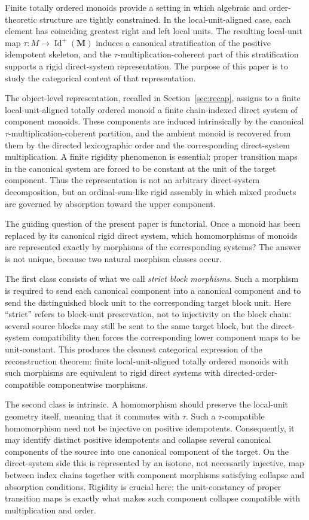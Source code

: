 \documentclass[pdflatex,sn-mathphys-num]{sn-jnl}
\theoremstyle{thmstyleone}%
\theoremstyle{thmstyletwo}%
\theoremstyle{thmstylethree}%
\newcommand{\PosId}{\operatorname{Id}^{+}}
\begin{document}
Finite totally ordered monoids provide a setting in which algebraic and order-theoretic structure are tightly constrained.
In the local-unit-aligned case, each element has coinciding greatest right and left local units.
The resulting local-unit map \(\tau\colon M\to \PosId(\mathbf M)\) induces a canonical stratification of the positive idempotent skeleton, and the \(\tau\)-multiplication-coherent part of this stratification supports a rigid direct-system representation.
The purpose of this paper is to study the categorical content of that representation.

The object-level representation, recalled in Section~\ref{sec:recap}, assigns to a finite local-unit-aligned totally ordered monoid a finite chain-indexed direct system of component monoids.
These components are induced intrinsically by the canonical \(\tau\)-multiplication-coherent partition, and the ambient monoid is recovered from them by the directed lexicographic order and the corresponding direct-system multiplication.
A finite rigidity phenomenon is essential: proper transition maps in the canonical system are forced to be constant at the unit of the target component.
Thus the representation is not an arbitrary direct-system decomposition, but an ordinal-sum-like rigid assembly in which mixed products are governed by absorption toward the upper component.

The guiding question of the present paper is functorial.
Once a monoid has been replaced by its canonical rigid direct system, which homomorphisms of monoids are represented exactly by morphisms of the corresponding systems?
The answer is not unique, because two natural morphism classes occur.

The first class consists of what we call \emph{strict block morphisms}.
Such a morphism is required to send each canonical component into a canonical component and to send the distinguished block unit to the corresponding target block unit.
Here ``strict'' refers to block-unit preservation, not to injectivity on the block chain: several source blocks may still be sent to the same target block, but the direct-system compatibility then forces the corresponding lower component maps to be unit-constant.
This produces the cleanest categorical expression of the reconstruction theorem: finite local-unit-aligned totally ordered monoids with such morphisms are equivalent to rigid direct systems with directed-order-compatible componentwise morphisms.

The second class is intrinsic.
A homomorphism should preserve the local-unit geometry itself, meaning that it commutes with \(\tau\).
Such a \(\tau\)-compatible homomorphism need not be injective on positive idempotents.
Consequently, it may identify distinct positive idempotents and collapse several canonical components of the source into one canonical component of the target.
On the direct-system side this is represented by an isotone, not necessarily injective, map between index chains together with component morphisms satisfying collapse and absorption conditions.
Rigidity is crucial here: the unit-constancy of proper transition maps is exactly what makes such component collapse compatible with multiplication and order.
\end{document}
